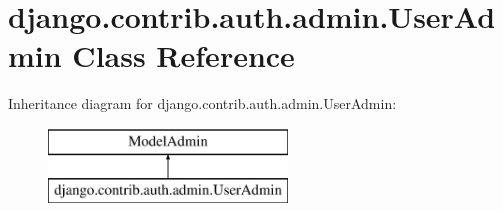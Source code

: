 \hypertarget{classdjango_1_1contrib_1_1auth_1_1admin_1_1_user_admin}{}\section{django.\+contrib.\+auth.\+admin.\+User\+Admin Class Reference}
\label{classdjango_1_1contrib_1_1auth_1_1admin_1_1_user_admin}
Inheritance diagram for django.\+contrib.\+auth.\+admin.\+User\+Admin\+:\begin{figure}[H]
\begin{center}
\leavevmode
\includegraphics[height=2.000000cm]{classdjango_1_1contrib_1_1auth_1_1admin_1_1_user_admin}
\end{center}
\end{figure}
